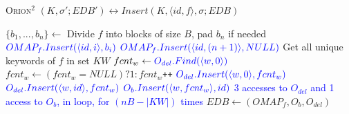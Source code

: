 \documentclass[sigconf]{acmart}
\newcommand{\pair}[2]{{\langle \ensuremath{#1, #2} \rangle}}
\newcommand{\vol}[1]{\lvert{#1}\rvert}
\newcommand{\Orionsq}{\textsc{Orion}$^{2}$ }
\newcommand{\tblue}[1]{\textcolor{blue}{#1}}
\begin{document}
\begin{algorithm}
\caption{\Orionsq $ (K,\sigma';EDB')\leftrightarrow Insert(K,\pair{id}{f},\sigma; EDB)$}\label{orionspins}
\begin{algorithmic}[1]
\State$\{b_1,...,b_n\} \gets$ Divide $f$ into blocks of size $B$, pad $b_n$ if needed  \label{oinsalgo:blocks}
  \State $\textcolor{blue}{OMAP_{f}.Insert(\pair{id}{i},b_i)}$
 \EndFor \label{oinsalgo:insblocks}
  \State $\tblue{OMAP_{f}.Insert(\pair{id}{(n+1)},NULL)}$ \label{oinsalgo:nullblock}
 \State Get all unique keywords of $f$ in set $KW$ 
  \label{oinsalgo:forloopstart}
    \State $fcnt_w \gets \tblue{O_{del}.Find(\pair{w}{0})}$ \label{oinsalgo:getfcnt}
    \State $fcnt_w \gets (fcnt_w=NULL)?1:fcnt_w$\texttt{++} \label{oinsalgo:fcntinc}
    \State $\tblue{O_{del}.Insert(\pair{w}{0},fcnt_w)}$\label{oinsalgo:setfcnt} \label{oinsalgo:fcntupdt}
    \State $\tblue{O_{del}.Insert(\pair{w}{id},fcnt_w)}$\label{oinsalgo:fcntidupdt}
   \State $\tblue{O_{b}.Insert(\pair{w}{fcnt_w},id)}$\label{oinsalgo:updtidblock}
\EndFor \label{oinsalgo:forloopend}
\State \tblue{3 accesses to $O_{del}$ and 1 access to $O_{b}$, in loop, for $(nB-\vol{KW})$ times} \label{oinsalgo:fake}
\State $EDB \gets (OMAP_{f},O_{b},O_{del})$ 
\end{algorithmic}
\label{Algo:orionsqUpdate}
\end{algorithm}
\end{document}
